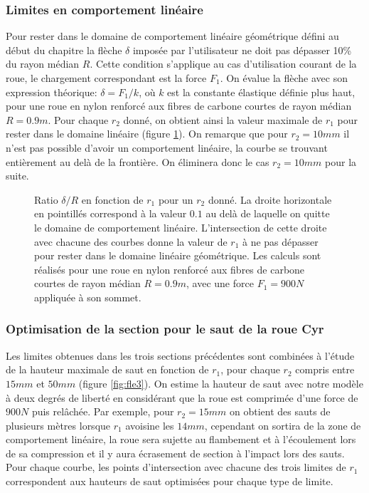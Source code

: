 \subsubsection{Limites en comportement linéaire}
Pour rester dans le domaine de comportement linéaire géométrique défini au début du chapitre la flèche $\delta$ imposée par l'utilisateur ne doit pas dépasser 10\% du rayon médian $R$. 
Cette condition s'applique au cas d'utilisation courant de la roue, le chargement correspondant est la force $F_1$.
On évalue la flèche avec son expression théorique: $\delta=F_1/k$, où $k$ est la constante élastique définie plus haut, pour une roue en nylon renforcé aux fibres de carbone courtes de rayon médian $R=0.9 m$. 
Pour chaque $r_2$ donné, on obtient ainsi la valeur maximale de $r_1$ pour rester dans le domaine linéaire (figure \ref{fig:fle4}). On remarque que pour $r_2=10 mm$ il n'est pas possible d'avoir un comportement linéaire, la courbe se trouvant entièrement au delà de la frontière. On éliminera donc le cas $r_2=10 mm$ pour la suite.

\begin{figure}
\centering
\def\svgwidth{350}

\caption{Ratio $\delta/R$ en fonction de $r_1$ pour un $r_2$ donné. La droite horizontale en pointillés correspond à la valeur $0.1$ au delà de laquelle on quitte le domaine de comportement linéaire. L'intersection de cette droite avec chacune des courbes donne la valeur de $r_1$ à ne pas dépasser pour rester dans le domaine linéaire géométrique. Les calculs sont réalisés pour une roue en nylon renforcé aux fibres de carbone courtes de rayon médian $R=0.9 m$, avec une force $F_1=900N$ appliquée à son sommet.}
\label{fig:fle4}
\end{figure}

\subsubsection{Optimisation de la section pour le saut de la roue Cyr}
Les limites obtenues dans les trois sections précédentes sont combinées à l'étude de la hauteur maximale de saut en fonction de $r_1$, pour chaque $r_2$ compris entre $15 mm$ et $50 mm$ (figure \ref{fig:fle3}). On estime la hauteur de saut avec notre modèle à deux degrés de liberté en considérant que la roue est comprimée d'une force de $900N$ puis relâchée. Par exemple, pour $r_2=15 mm$ on obtient des sauts de plusieurs mètres lorsque $r_1$ avoisine les $14mm$, cependant on sortira de la zone de comportement linéaire, la roue sera sujette au flambement et à l'écoulement lors de sa compression et il y aura écrasement de section à l'impact lors des sauts. Pour chaque courbe, les points d'intersection avec chacune des trois limites de $r_1$ correspondent aux hauteurs de saut optimisées pour chaque type de limite.


